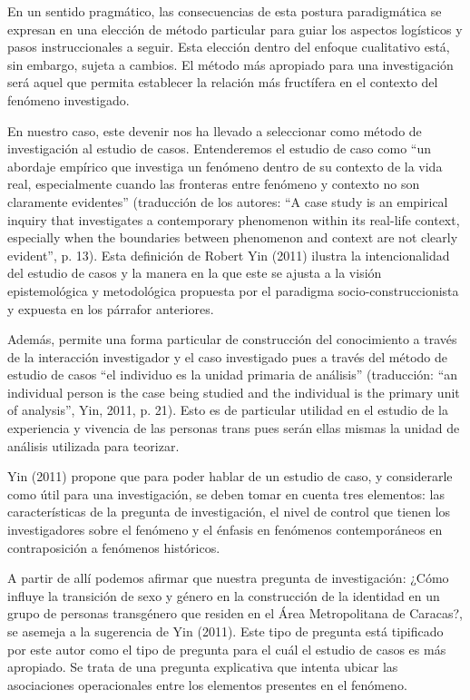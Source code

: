 En un sentido pragmático, las consecuencias de esta postura paradigmática se
expresan en una elección de método particular para guiar los aspectos logísticos
y pasos instruccionales a seguir.
Esta elección dentro del enfoque cualitativo está, sin embargo, sujeta a
cambios.
El método más apropiado para una investigación será aquel que permita establecer
la relación más fructífera en el contexto del fenómeno investigado.

En nuestro caso, este devenir nos ha llevado a seleccionar como método de
investigación al estudio de casos.
Entenderemos el estudio de caso como “un abordaje empírico que investiga un
fenómeno dentro de su contexto de la vida real, especialmente cuando las
fronteras entre fenómeno y contexto no son claramente evidentes” (traducción de
los autores: “A case study is an empirical inquiry that investigates a
contemporary phenomenon within its real-life context, especially when the
boundaries between phenomenon and context are not clearly evident”, p. 13).
Esta definición de Robert Yin (2011) ilustra la intencionalidad del estudio de
casos y la manera en la que este se ajusta a la visión epistemológica y
metodológica propuesta por el paradigma socio-construccionista y expuesta en los
párrafor anteriores.

Además, permite una forma particular de construcción del conocimiento a través
de la interacción investigador y el caso investigado pues a través del método de
estudio de casos “el individuo es la unidad primaria de análisis” (traducción:
“an individual person is the case being studied and the individual is the
primary unit of analysis”, Yin, 2011, p. 21).
Esto es de particular utilidad en el estudio de la experiencia y vivencia de las
personas trans pues serán ellas mismas la unidad de análisis utilizada para
teorizar.

Yin (2011) propone que para poder hablar de un estudio de caso, y considerarle
como útil para una investigación, se deben tomar en cuenta tres elementos: las
características de la pregunta de investigación, el nivel de control que tienen
los investigadores sobre el fenómeno y el énfasis en fenómenos contemporáneos en
contraposición a fenómenos históricos.

A partir de allí podemos afirmar que nuestra pregunta de investigación: ¿Cómo
influye la transición de sexo y género en la construcción de la identidad en un
grupo de personas transgénero que residen en el Área Metropolitana de  Caracas?,
se asemeja a la sugerencia de Yin (2011).
Este tipo de pregunta está tipificado por este autor como el tipo de pregunta
para el cuál el estudio de casos es más apropiado.
Se trata de una pregunta explicativa que intenta ubicar las asociaciones
operacionales entre los elementos presentes en el fenómeno.

